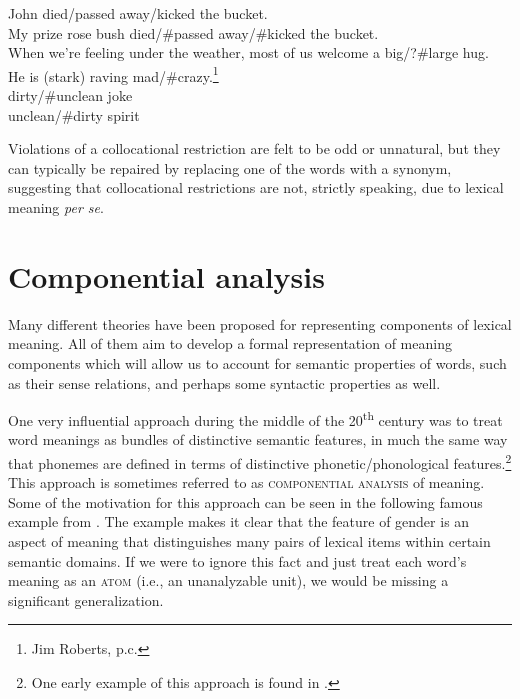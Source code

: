 \ea \label{ex:7.15}
\ea John died/passed away/kicked the bucket.\\
\ex My prize rose bush died/\#passed away/\#kicked the bucket.\\
\ex When we’re feeling under the weather, most of us welcome a big/?\#large hug.\\
\ex He is (stark) raving mad/\#crazy.\footnote{Jim Roberts, p.c.}\\
\ex dirty/\#unclean joke\\
\ex unclean/\#dirty spirit
                       \z
\z


Violations of a collocational restriction are felt to be odd or unnatural, but they can typically be repaired by replacing one of the words with a synonym, suggesting that collocational restrictions are not, strictly speaking, due to lexical meaning \textit{per se}.


\section{Componential analysis}\label{sec:7.4}

Many different theories have been proposed for representing components of lexical meaning. All of them aim to develop a formal representation of meaning components which will allow us to account for semantic properties of words, such as their sense relations, and perhaps some syntactic properties as well.



One very influential approach during the middle of the 20\textsuperscript{th} century was to treat word meanings as bundles of distinctive semantic features, in much the same way that phonemes are defined in terms of distinctive phonetic/phonological features.\footnote{One early example of this approach is found in \citet{Nida1951}.} This approach is sometimes referred to as \textsc{componential analysis} of meaning. Some of the motivation for this approach can be seen in the following famous example from \citet{Hjemslev1943/1953}. The example makes it clear that the feature of gender is an aspect of meaning that distinguishes many pairs of lexical items within certain semantic domains. If we were to ignore this fact and just treat each word’s meaning as an \textsc{atom} (i.e., an unanalyzable unit), we would be missing a significant generalization.



